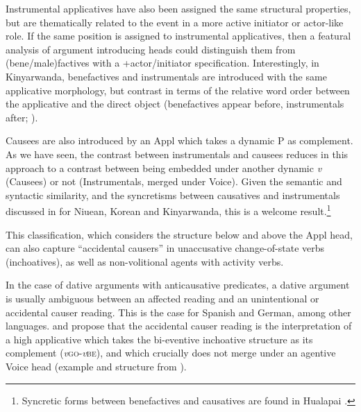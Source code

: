\documentclass[output=paper,colorlinks,citecolor=brown,modfonts,nonflat]{langsci/langscibook}
\begin{document}
Instrumental applicatives have also been assigned the same structural properties, but are thematically related to the event in a more active initiator or actor-like role. If the same position is assigned to instrumental applicatives, then a featural analysis of argument introducing heads could distinguish them from (bene/male)factives with a +actor/initiator specification. Interestingly, in Kinyarwanda, benefactives and instrumentals are introduced with the same applicative morphology, but contrast in terms of the relative word order between the applicative and the direct object (benefactives appear before, instrumentals after; \citealt{McGinnisGerdts2004}).

Causees are also introduced by an Appl which takes a dynamic {\liv}P as complement. As we have seen, the contrast between instrumentals and causees reduces in this approach to a contrast between being embedded under another dynamic \textit{v} (Causees) or not (Instrumentals, merged under Voice). Given the semantic and syntactic similarity, and the syncretisms between causatives and instrumentals discussed in  for Niuean, Korean and Kinyarwanda, this is a welcome result.\footnote{Syncretic forms between benefactives and causatives are found in Hualapai \citep{Peterson2007}.}

This classification, which considers the structure below and above the Appl head, can also capture “accidental causers” in unaccusative change-of-state verbs (inchoatives), as well as non-volitional agents with activity verbs.

\largerpage
In the case of dative arguments with anticausative predicates, a dative argument is usually ambiguous between an affected reading and an unintentional or accidental causer reading. This is the case for Spanish and German, among other languages. \citet{Cuervo2003,Cuervo2014} and \citet{Schäfer2008} propose that the accidental causer reading is the interpretation of a high applicative which takes the bi-eventive inchoative structure as its complement (\textit{v}\textsc{go}-\textit{v}\textsc{be}), and which crucially does not merge under an agentive Voice head (example and structure from \citealt[166--167]{Cuervo2003}).
\end{document}

